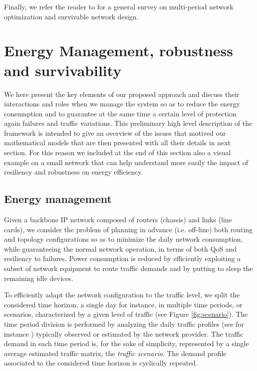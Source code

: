 \documentclass[final,5p,times,twocolumn]{elsarticle}
\begin{document}
Finally, we refer the reader to \cite{pioro04} for a general survey on multi-period network optimization and survivable network design.


\section{Energy Management, robustness and survivability}\label{sec:ems}
\label{sec:problem}

We here present the key elements of our proposed approach and discuss their interactions and roles when we manage the system so as to reduce the energy consumption and to guarantee at the same time a certain level of protection again failures and traffic variations. This preliminary high level description of the framework is intended to give an overview of the issues that motived our mathematical models that are then presented with all their details in next section. For this reason we included at the end of this section also a visual example on a small network that can help understand more easily the impact of resiliency and robustness on energy efficiency. 


\subsection{Energy management}
Given a backbone IP network composed of routers (chassis) and links (line cards), we consider the problem of planning in advance (i.e. off-line) both routing and topology configurations so as to minimize the daily network consumption, while guaranteeing the normal network operation, in terms of both QoS and resiliency to failures. Power consumption is reduced by efficiently exploiting a subset of network equipment to route traffic demands and by putting to sleep the remaining idle devices. 

To efficiently adapt the network configuration to the traffic level, we split the considered time horizon, a single day for instance, in multiple time periods, or scenarios, characterized by a given level of traffic (see Figure \ref{fig:scenario}). The time period division is performed by analyzing the daily traffic profiles (see for instance \cite{Geant}) typically observed or estimated by the network provider. The traffic demand in each time period is, for the sake of simplicity, represented by a single average estimated traffic matrix, the  \textit{traffic scenario}. The demand profile associated to the considered time horizon is cyclically repeated. 
\end{document}
